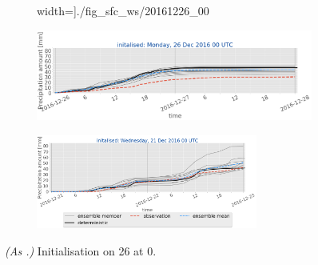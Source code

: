 \begin{figure}[H]
\begin{subfigure}[b]{0.9\textwidth}
		width=\textwidth]{./fig_sfc_ws/20161226_00}
		\caption{}\label{fig:res:sfc_ws26}
	\end{subfigure}
	\begin{subfigure}[b]{0.9\textwidth}
		\includegraphics[trim={0.cm 1.5cm 0cm 0cm},clip,
		width=\textwidth]{./fig_sfc_precip/20161226_00}
		\caption{}\label{fig:res:sfc_precip26}
	\end{subfigure}
	\begin{subfigure}[b]{\textwidth}
		\centering
		\includegraphics[trim={5.5cm 0cm 5.cm 17.7cm},clip,
		width=0.8\textwidth]{./fig_sfc_precip/20161221_00_label}
	\end{subfigure}
	\caption{\textit{(As .)} Initialisation on \SI{26}{\dec} at \SI{0}{\UTC}.}\label{fig:obs_meps:26}
\end{figure}
%
